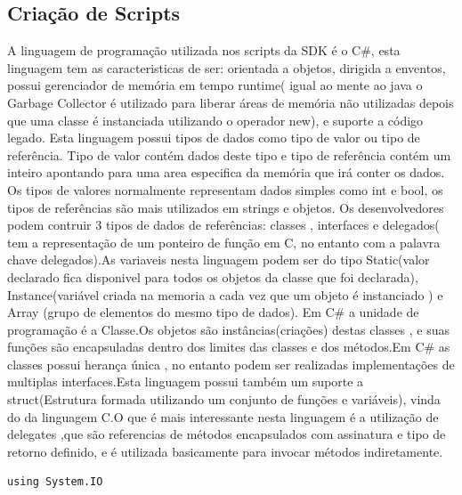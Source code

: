 \subsection{Criação de Scripts}
\label{sub:criacao_de_scripts}
       A linguagem de programação utilizada nos scripts da SDK é o C\#, esta linguagem tem as caracteristicas de ser: orientada a objetos, dirigida a enventos, possui gerenciador de memória em tempo runtime( igual ao mente ao java o Garbage Collector é utilizado para liberar áreas de memória não utilizadas depois que uma classe é instanciada utilizando o operador new), e suporte a código legado.
       Esta linguagem possui tipos de dados como tipo de valor ou tipo de referência. Tipo de valor contém dados deste tipo e tipo de referência contém um inteiro apontando para uma area especifica da memória que irá conter os dados. Os tipos de valores normalmente representam dados simples como int e bool,  os tipos de referências são mais utilizados em strings e objetos. Os desenvolvedores podem contruir 3 tipos de dados de referências: classes , interfaces e delegados( tem a representação de um ponteiro de função em C, no entanto com a palavra chave delegados).As variaveis nesta linguagem podem ser do tipo Static(valor declarado fica disponivel para todos os objetos da classe que foi declarada), Instance(variável criada na memoria a cada vez que um  objeto é instanciado ) e Array (grupo de elementos do mesmo tipo de dados).
      Em C\# a unidade de programação é a Classe.Os objetos são instâncias(criações) destas classes , e suas funções são encapsuladas dentro dos limites  das classes e dos métodos.Em C\# as classes possui herança única , no entanto podem ser realizadas implementações de multiplas interfaces.Esta linguagem possui também um suporte a struct(Estrutura formada utilizando um conjunto de funções e variáveis), vinda do da linguagem C.O que é mais interessante nesta linguagem é a utilização de delegates ,que são referencias de métodos encapsulados com assinatura e tipo de retorno definido, e é utilizada basicamente para invocar métodos indiretamente.

\begin{lstlisting}[language=C_sharp,caption={leitura de um arquivo},label=trecho_item_C_sharp ]
using System.IO

\end{lstlisting}




